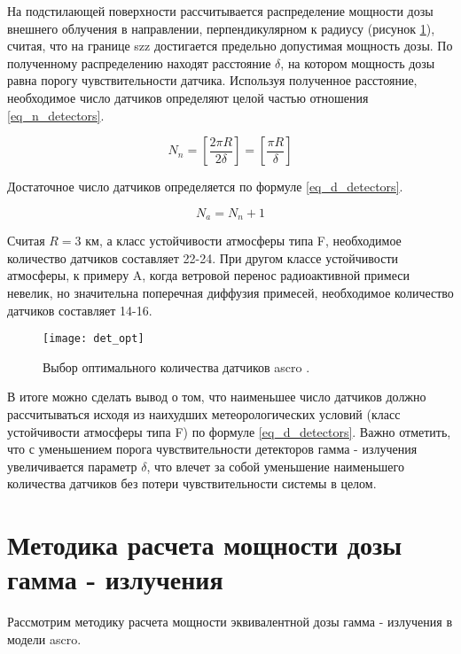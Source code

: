 На подстилающей поверхности рассчитывается распределение мощности дозы внешнего облучения в направлении, 
перпендикулярном к радиусу (рисунок \ref{fig_det_opt}), считая, что на границе \ac{szz} достигается предельно допустимая
мощность дозы. По полученному распределению находят расстояние $\delta$, на котором мощность дозы равна порогу 
чувствительности датчика. Используя полученное расстояние, необходимое число датчиков определяют целой частью отношения 
\ref{eq_n_detectors}.

\begin{equation}
    \label{eq_n_detectors}
    N_n = [\frac{2 \pi R}{2 \delta}] = [\frac{\pi R}{\delta}]
\end{equation}

Достаточное число датчиков определяется по формуле \ref{eq_d_detectors}.

\begin{equation}
    \label{eq_d_detectors}
    N_a = N_n + 1
\end{equation}

Считая $R = 3$ км, а класс устойчивости атмосферы типа F, необходимое количество датчиков составляет 22-24. При другом классе
устойчивости атмосферы, к примеру A, когда ветровой перенос радиоактивной примеси невелик, но значительна поперечная диффузия
примесей, необходимое количество датчиков составляет 14-16.

\begin{figure}[ht!]
    \centering
    \texttt{[image: det\_opt]}
    \captionsetup{justification=centering}
    \caption{Выбор оптимального количества датчиков \ac{ascro} \cite{elokhin}.}
    \label{fig_det_opt}
\end{figure}


В итоге можно сделать вывод о том, что наименьшее число датчиков должно рассчитываться исходя из наихудших метеорологических
условий (класс устойчивости атмосферы типа F) по формуле \ref{eq_d_detectors}. Важно отметить, что с уменьшением порога 
чувствительности детекторов гамма - излучения увеличивается параметр $\delta$, что влечет за собой уменьшение наименьшего
количества датчиков без потери чувствительности системы в целом.

\section{Методика расчета мощности дозы гамма - излучения}

Рассмотрим методику расчета мощности эквивалентной дозы гамма - излучения в модели \ac{ascro}.

